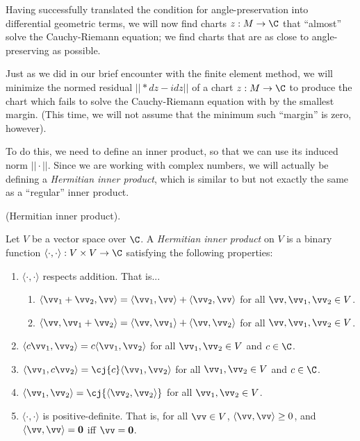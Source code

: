 Having successfully translated the condition for angle-preservation into differential geometric terms, we will now find charts $z:M \rightarrow \C$ that ``almost'' solve the Cauchy-Riemann equation; we find charts that are as close to angle-preserving as possible.

Just as we did in our brief encounter with the finite element method, we will minimize the normed residual $||*dz - idz||$ of a chart $z:M \rightarrow \C$ to produce the chart which fails to solve the Cauchy-Riemann equation with by the smallest margin. (This time, we will not assume that the minimum such ``margin'' is zero, however).

To do this, we need to define an inner product, so that we can use its induced norm $||\cdot||$. Since we are working with complex numbers, we will actually be defining a \textit{Hermitian inner product}, which is similar to but not exactly the same as a ``regular'' inner product.

\begin{defn}
    (Hermitian inner product).
    
    Let $V$ be a vector space over $\C$. A \textit{Hermitian inner product} on $V$ is a binary function $\langle \cdot, \cdot \rangle:V \times V \rightarrow \C$ satisfying the following properties:
    
    \begin{enumerate}
        \item $\langle \cdot, \cdot \rangle$ respects addition. That is...
        \begin{enumerate}
            \item $\langle \vv_1 + \vv_2, \vv \rangle = \langle \vv_1, \vv \rangle + \langle \vv_2, \vv \rangle$ for all $\vv, \vv_1, \vv_2 \in V$.
            \item $\langle \vv, \vv_1 + \vv_2 \rangle = \langle \vv, \vv_1 \rangle + \langle \vv, \vv_2 \rangle$ for all $\vv, \vv_1, \vv_2 \in V$.
        \end{enumerate}
        \item $\langle c \vv_1, \vv_2 \rangle = c \langle \vv_1, \vv_2 \rangle$ for all $\vv_1, \vv_2 \in V$ and $c \in \C$.
        \item $\langle \vv_1, c \vv_2 \rangle = \cj{c} \langle \vv_1, \vv_2 \rangle$ for all $\vv_1, \vv_2 \in V$ and $c \in \C$.
        \item $\langle \vv_1, \vv_2 \rangle = \cj{\langle \vv_2, \vv_2 \rangle}$ for all $\vv_1, \vv_2 \in V$.
        \item $\langle \cdot, \cdot \rangle$ is positive-definite. That is, for all $\vv \in V$, $\langle \vv, \vv \rangle \geq 0$, and $\langle \vv, \vv \rangle = \mathbf{0}$ iff $\vv = \mathbf{0}$.
    \end{enumerate}
\end{defn}

